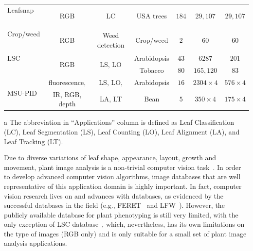 \begin{table}[t!]
\begin{threeparttable}
\begin{tabular}{l|c|c|c|c|c|c}
Leafsnap & \multirow{2}{*}{RGB} & \multirow{2}{*}{LC} & \multirow{2}{*}{USA trees} & \multirow{2}{*}{$184$} & \multirow{2}{*}{$29,107$} & \multirow{2}{*}{$29,107$} \\
~\cite{kumar2012leafsnap} & & & & & & \\ \hline
Crop/weed & \multirow{2}{*}{RGB} & \multirow{2}{*}{Weed detection} & \multirow{2}{*}{Crop/weed} & \multirow{2}{*}{$2$} & \multirow{2}{*}{$60$} & \multirow{2}{*}{$60$} \\
~\cite{haug2014crop} & & & & & & \\ \hline
LSC & \multirow{2}{*}{RGB} & \multirow{2}{*}{LS, LO} & Arabidopsis & $43$ & $6287$ & $201$ \\ \cline{4-7}
~\cite{haug2014crop} & & & Tobacco & $80$ & $165,120$ & $83$ \\ \hline
\multirow{2}{*}{MSU-PID} & fluorescence, & LS, LO, & Arabidopsis & $16$ & $2304\times 4$ & $576\times 4$ \\ \cline{4-7}
& IR, RGB, depth & LA, LT & Bean & $5$ & $350\times 4$ & $175\times 4$ \\ \hline
\hline
\end{tabular}
\begin{tablenotes}
\footnotesize
\item[a] The abbreviation in ``Applications'' column is defined as Leaf Classification (LC), Leaf Segmentation (LS), Leaf Counting (LO), Leaf Alignment (LA), and Leaf Tracking (LT).
\end{tablenotes}
\end{threeparttable}
\label{tab:database}
\end{table}

Due to diverse variations of leaf shape, appearance, layout, growth and movement, plant image analysis is a non-trivial computer vision task~\cite{Minervini2015}.
In order to develop advanced computer vision algorithms, image databases that are well representative of this application domain is highly important.
In fact, computer vision research lives on and advances with databases, as evidenced by the successful databases in the field (e.g., FERET~\cite{Phillips2000} and LFW~\cite{LFW}).
However, the publicly available database for plant phenotyping is still very limited, with the only exception of LSC database~\cite{scharr2014annotated}, which, nevertheless, has its own limitations on the type of images (RGB only) and is only suitable for a small set of plant image analysis applications.


